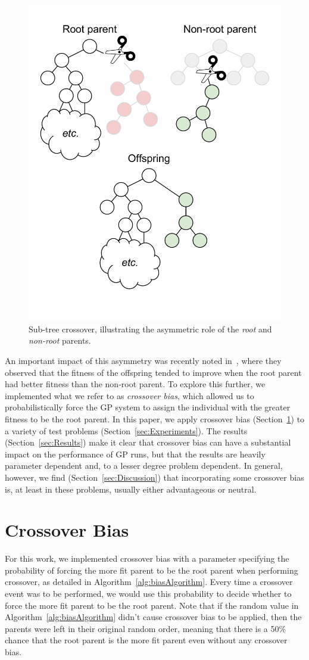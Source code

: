 \documentclass{sig-alternate}
\begin{document}
\begin{figure}
	\centering
	\includegraphics[width=0.45 \textwidth]{Plots/Root_parent_illustration_no_triangle.pdf}
	\caption{Sub-tree crossover, illustrating the asymmetric role of the \emph{root} and \emph{non-root} parents.}
	\label{fig:root_parent_illustration}
\end{figure}

An important impact of this asymmetry was recently noted in~\cite{McPheeDonatucciDramdahl:2014}, where they observed
that the fitness of the offspring tended to improve when the root parent had better fitness than the non-root parent.
To explore this further, we implemented what we refer to as \emph{crossover bias}, which allowed us to
probabilistically force the GP system to assign the individual with the greater fitness to be the root parent. In this
paper, we apply crossover bias (Section~\ref{sec:XObias}) to a variety of test problems
(Section~\ref{sec:Experiments}). The results (Section~\ref{sec:Results}) make it clear that crossover bias can have a
substantial impact on the performance of GP runs, but that the results are heavily parameter dependent and, to a lesser
degree problem dependent. In general, however, we find (Section~\ref{sec:Discussion}) that incorporating some crossover
bias is, at least in these problems, usually either advantageous or neutral. 

\section{Crossover Bias} \label{sec:XObias}

For this work, we implemented crossover bias with a parameter specifying the probability of forcing the more fit parent
to be the root parent when performing crossover, as detailed in Algorithm~\ref{alg:biasAlgorithm}. Every time a
crossover event was to be performed, we would use this probability to decide whether to force the more fit parent to be
the root parent. Note that if the random value in Algorithm~\ref{alg:biasAlgorithm} didn't cause crossover bias to be
applied, then the parents were left in their original random order, meaning that there is a 50\% chance that the root
parent is the more fit parent even without any crossover bias.
\end{document}
